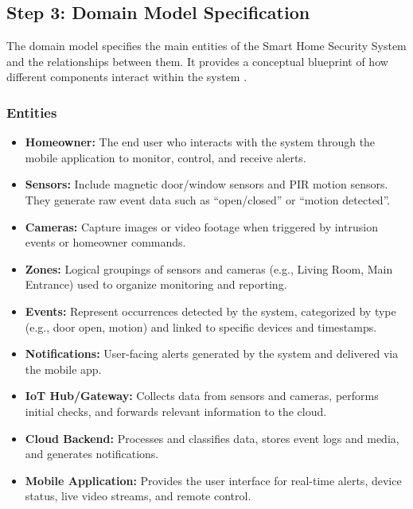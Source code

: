 \documentclass[conference]{IEEEtran}
\begin{document}
\subsection{Step 3: Domain Model Specification}
The domain model specifies the main entities of the Smart Home Security System and
the relationships between them. It provides a conceptual blueprint of how different
components interact within the system \cite{achtaich2021guidelines, seerangan_domain_specific_iot_home_automation_2022, zwemer_smart_home_iot_part2_2015}.

\subsubsection{Entities}
\begin{itemize}
    \item \textbf{Homeowner:} The end user who interacts with the system through the mobile application to monitor, control, and receive alerts.
    \item \textbf{Sensors:} Include magnetic door/window sensors and PIR motion sensors. They generate raw event data such as ``open/closed'' or ``motion detected''.
    \item \textbf{Cameras:} Capture images or video footage when triggered by intrusion events or homeowner commands.
    \item \textbf{Zones:} Logical groupings of sensors and cameras (e.g., Living Room, Main Entrance) used to organize monitoring and reporting.
    \item \textbf{Events:} Represent occurrences detected by the system, categorized by type (e.g., door open, motion) and linked to specific devices and timestamps.
    \item \textbf{Notifications:} User-facing alerts generated by the system and delivered via the mobile app.
    \item \textbf{IoT Hub/Gateway:} Collects data from sensors and cameras, performs initial checks, and forwards relevant information to the cloud.
    \item \textbf{Cloud Backend:} Processes and classifies data, stores event logs and media, and generates notifications.
    \item \textbf{Mobile Application:} Provides the user interface for real-time alerts, device status, live video streams, and remote control.
\end{itemize}
\end{document}
